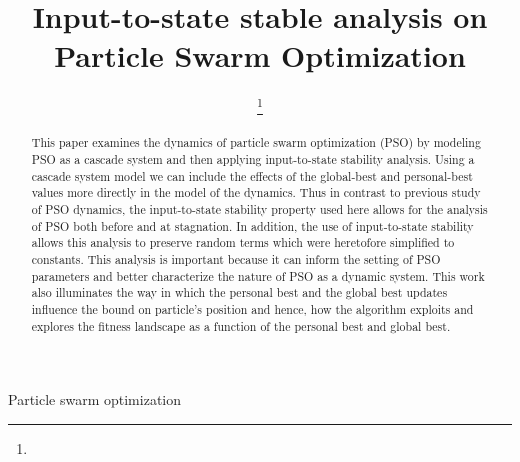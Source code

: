 \documentclass[journal]{IEEEtran}
\begin{document}
\title{Input-to-state stable analysis on Particle Swarm Optimization}

\author{

\thanks{}
}

\markboth{}{}

\maketitle

\begin{abstract}
This paper examines the dynamics of particle swarm optimization (PSO) by modeling PSO as a cascade system and then applying input-to-state stability analysis.
Using a cascade system model we can
include the effects of the global-best and personal-best values more directly in the model of the dynamics.
Thus in contrast to previous study of PSO dynamics, the input-to-state stability property used here allows for the analysis of PSO both before and at stagnation.
In addition, the use of input-to-state stability allows this analysis to preserve random terms which were heretofore simplified to constants.
This analysis is important because it can inform the setting of PSO parameters and better characterize the nature of PSO as a dynamic system.
This work also illuminates the way in which the personal best and the global best updates influence the bound on particle's position and hence, how the algorithm
exploits and explores the fitness landscape as a function of the personal best and global best.
\end{abstract}

\begin{IEEEkeywords}
Particle swarm optimization
\end{IEEEkeywords}

\IEEEpeerreviewmaketitle

















\end{document}
